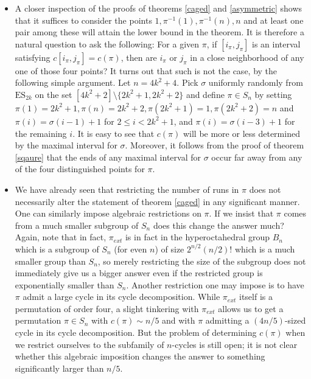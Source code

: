 \documentclass[11pt, a4paper]{article}
\theoremstyle{compact}
\begin{document}
\begin{itemize}
\item A closer inspection of the proofs of theorems \ref{caged} and \ref{asymmetric} shows that it suffices to consider the points $1,\pi^{-1}(1),\pi^{-1}(n), n$ and at least one pair among these will attain the lower bound in the theorem. It is therefore a natural question to ask the following: For a given $\pi$, if $[i_{\pi},j_{\pi}]$ is an interval satisfying $c[i_{\pi},j_{\pi}]=c(\pi)$, then are $i_{\pi}$ or $j_{\pi}$ in a close neighborhood of any one of those four points? It turns out that such is not the case, by the following simple argument. Let $n=4k^2+4$. Pick $\sigma$ uniformly randomly from $\mathrm{ES}_{2k}$ on the set $[4k^2+2] \setminus \{2k^2 +1, 2k^2 + 2 \}$ and define $\pi\in S_n$ by setting $\pi(1)=2k^2+1,\pi(n)=2k^2+2, \pi(2k^2+1)=1, \pi(2k^2+2)=n$ and $\pi(i)=\sigma(i-1)+1$ for $2\leq i< 2k^2 + 1$, and $\pi(i) = \sigma(i-3) + 1$ for the remaining $i$. It is easy to see that $c(\pi)$ will be more or less determined by the maximal interval for $\sigma$. Moreover, it follows from the proof of theorem \ref{sqaure} that the ends of any maximal interval for $\sigma$ occur far away from any of the four distinguished points for $\pi$.
\item We have already seen that restricting the number of runs in $\pi$ does not necessarily alter the statement of theorem \ref{caged} in any significant manner. One can similarly impose algebraic restrictions on $\pi$. If we insist that $\pi$ comes from a much smaller subgroup of $S_n$ does this change the answer much? Again, note that in fact, $\pi_{ext}$ is in fact in the hyperoctahedral group $B_n$ which is a subgroup of $S_n$ (for even $n$) of size $2^{n/2}(n/2)!$ which is a much smaller group than $S_n$, so merely restricting the size of the subgroup does not immediately give us a bigger answer even if the restricted group is exponentially smaller than $S_n$. Another restriction one may impose is to have $\pi$ admit a large cycle in its cycle decomposition. While $\pi_{ext}$ itself is a permutation of order four, a slight tinkering with $\pi_{ext}$ allows us to get a permutation $\pi\in S_n$ with $c(\pi)\sim n/5$ and with $\pi$ admitting a $(4n/5)$-sized cycle in its cycle decomposition. But the problem of determining $c(\pi)$ when we restrict ourselves to the subfamily of $n$-cycles is still open; it is not clear whether this algebraic imposition changes the answer to something significantly larger than $n/5$.

\end{itemize}
\end{document}
